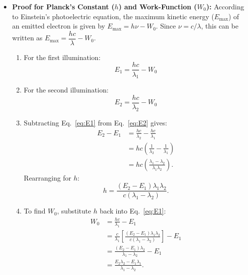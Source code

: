 \documentclass[12pt]{article}
\begin{document}
\begin{itemize}
    \item \textbf{Proof for Planck's Constant ($h$) and Work-Function ($W_0$):}
    According to Einstein's photoelectric equation, the maximum kinetic energy ($E_{\max}$) of an emitted electron is given by $E_{\max}=h\nu-W_0$. Since $\nu=c/\lambda$, this can be written as $E_{\max}=\dfrac{hc}{\lambda}-W_0$.
    \begin{enumerate}[label=\alph*.]
        \item For the first illumination:
        \begin{equation}
            \label{eq:E1}
            E_1=\frac{hc}{\lambda_1}-W_0
        \end{equation}
        \item For the second illumination:
        \begin{equation}
            \label{eq:E2}
            E_2=\frac{hc}{\lambda_2}-W_0
        \end{equation}
        \item Subtracting Eq.~\eqref{eq:E1} from Eq.~\eqref{eq:E2} gives:
        \begin{align*}
            E_2-E_1&=\frac{hc}{\lambda_2}-\frac{hc}{\lambda_1}\\
                   &=hc\left(\frac{1}{\lambda_2}-\frac{1}{\lambda_1}\right)\\
                   &=hc\left(\frac{\lambda_1-\lambda_2}{\lambda_1\lambda_2}\right).
        \end{align*}
        Rearranging for $h$:
        \[
          h=\frac{(E_2-E_1)\lambda_1\lambda_2}{c(\lambda_1-\lambda_2)}.
        \]
        \item To find $W_0$, substitute $h$ back into Eq.~\eqref{eq:E1}:
        \begin{align*}
            W_0&=\frac{hc}{\lambda_1}-E_1\\
               &=\frac{c}{\lambda_1}\left[\frac{(E_2-E_1)\lambda_1\lambda_2}{c(\lambda_1-\lambda_2)}\right]-E_1\\
               &=\frac{(E_2-E_1)\lambda_2}{\lambda_1-\lambda_2}-E_1\\
               &=\frac{E_2\lambda_2-E_1\lambda_1}{\lambda_1-\lambda_2}.
        \end{align*}
    \end{enumerate}


\end{itemize}
\end{document}
